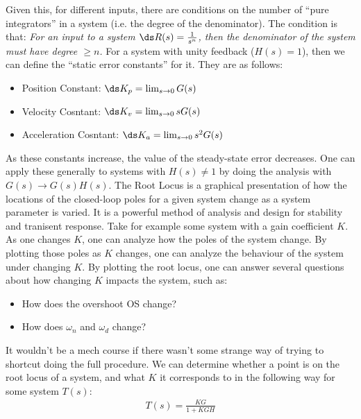 \documentclass{article}
\begin{document}
Given this, for different inputs, there are conditions on the number of ``pure integrators'' in a system (i.e. the degree of the denominator). The condition is that:
\gap
\textit{For an input to a system $\ds R(s) = \frac{1}{s^n}$, then the denominator of the system must have degree $\geq n$.}
\gap
{} For a system with unity feedback ($H(s) = 1$), then we can
define the ``static error constants'' for it. They are as follows:
\begin{itemize}
\item Position Constant: $\ds K_p = \lim_{s \to 0} G(s)$
\item Velocity Cosntant: $\ds K_v = \lim_{s \to 0} sG(s)$
\item Acceleration Cosntant: $\ds K_a = \lim_{s \to 0} s^2G(s)$  
\end{itemize}
As these constants increase, the value of the steady-state error decreases. One can apply these generally to systems with $H(s) \neq 1$ by doing the analysis with $G(s) \to G(s)H(s)$.
\gap
{}
The Root Locus is a graphical presentation of how the locations of the closed-loop poles for a given system change as a system parameter is varied. It is a powerful method of analysis and design for stability and tranisent response.
\gap
Take for example some system with a gain coefficient $K$. As one changes $K$, one can analyze how the poles of the system change. By plotting those poles as $K$ changes, one can analyze the behaviour of the system under changing $K$. By plotting the root locus, one can answer several questions about how changing $K$ impacts the system, such as:
\begin{itemize}
\item How does the overshoot OS change?
\item How does $\omega_n$ and $\omega_d$ change?
\end{itemize}

 It wouldn't be a mech course if there wasn't some strange way of trying to shortcut doing the full procedure. We can determine whether a point is on the root locus of a system, and what $K$ it corresponds to in the following way for some system $T(s)$:
\begin{align*}
  T(s) = \frac{KG}{1 + KGH}
\end{align*}
\end{document}
